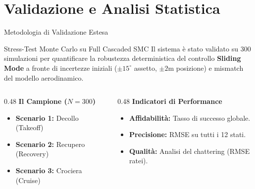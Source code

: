 \documentclass[aspectratio=169]{beamer} %
\begin{document}
\section{Validazione e Analisi Statistica}

\begin{frame}{Metodologia di Validazione Estesa}
    \begin{alertblock}{Stress-Test Monte Carlo su Full Cascaded SMC}
        Il sistema è stato validato su 300 simulazioni per quantificare la robustezza deterministica del controllo \textbf{Sliding Mode} a fronte di incertezze iniziali ($\pm 15^\circ$ assetto, $\pm 2$m posizione) e mismatch del modello aerodinamico.
    \end{alertblock}

    \vspace{0.4cm}
    \begin{columns}[T]
        \begin{column}{0.48\textwidth}
            \textbf{\large Il Campione ($N=300$)}
            \begin{itemize}
                \item \textbf{Scenario 1:} Decollo (Takeoff)
                \item \textbf{Scenario 2:} Recupero (Recovery)
                \item \textbf{Scenario 3:} Crociera (Cruise)
            \end{itemize}
        \end{column}
        
        \begin{column}{0.48\textwidth}
            \textbf{\large Indicatori di Performance}
            \begin{itemize}
                \item \textbf{Affidabilità:} Tasso di successo globale.
                \item \textbf{Precisione:} RMSE su tutti i 12 stati.
                \item \textbf{Qualità:} Analisi del chattering (RMSE ratei).
            \end{itemize}
        \end{column}
    \end{columns}
\end{frame}
\end{document}
